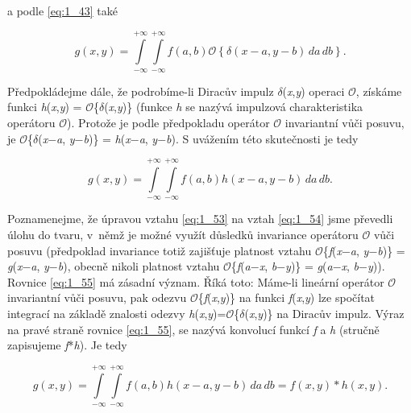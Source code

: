 \noindent a podle \eqref{eq:1_43} také

\begin{equation} \label{eq:1_54}
    g(x, y) = \int\limits_{-\infty}^{+\infty} \int\limits_{-\infty}^{+\infty} f(a, b) \mathcal{O} \left\{ \delta(x-a, y-b) \,da \,db \right\}.
\end{equation}

Předpokládejme dále, že podrobíme-li Diracův impulz $\delta$(\textit{x},\textit{y}) operaci $\mathscr{O}$, získáme funkci \textit{h}(\textit{x},\textit{y}) = $\mathscr{O}$\{$\delta$(\textit{x},\textit{y})\} (funkce \textit{h} se nazývá impulzová charakteristika operátoru $\mathscr{O}$). Protože je podle předpokladu operátor $\mathscr{O}$ invariantní vůči posuvu, je $\mathscr{O}$\{$\delta$(\textit{x}$-$\textit{a}, \textit{y}$-$\textit{b})\} = \textit{h}(\textit{x}$-$\textit{a}, \textit{y}$-$\textit{b}). S uvážením této skutečnosti je tedy

\begin{equation} \label{eq:1_55}
    g(x, y) = \int\limits_{-\infty}^{+\infty} \int\limits_{-\infty}^{+\infty} f(a, b) h(x-a, y-b) \,da \,db.
\end{equation}

Poznamenejme, že úpravou vztahu \eqref{eq:1_53} na vztah \eqref{eq:1_54} jsme převedli úlohu do tvaru, v~němž je možné využít důsledků invariance operátoru $\mathscr{O}$ vůči posuvu (předpoklad invariance totiž zajišťuje platnost vztahu $\mathscr{O}$\{\textit{f}(\textit{x}$-$\textit{a}, \textit{y}$-$\textit{b})\} =  \textit{g}(\textit{x}$-$\textit{a}, \textit{y}$-$\textit{b}), obecně nikoli platnost vztahu $\mathscr{O}$\{\textit{f}(\textit{a}$-$\textit{x}, \textit{b}$-$\textit{y})\} =  \textit{g}(\textit{a}$-$\textit{x}, \textit{b}$-$\textit{y})). Rovnice \eqref{eq:1_55} má zásadní význam. Říká toto: Máme-li lineární operátor $\mathscr{O}$ invariantní vůči posuvu, pak odezvu $\mathscr{O}$\{\textit{f}(\textit{x},\textit{y})\} na funkci \textit{f}(\textit{x},\textit{y}) lze spočítat integrací na základě znalosti odezvy \textit{h}(\textit{x},\textit{y})=$\mathscr{O}$\{$\delta$(\textit{x},\textit{y})\} na Diracův impulz. Výraz na pravé straně rovnice \eqref{eq:1_55}, se nazývá konvolucí funkcí \textit{f} a \textit{h} (stručně zapisujeme \textit{f}*\textit{h}). Je tedy

\begin{equation} \label{eq:1_56}
    g(x, y) = \int\limits_{-\infty}^{+\infty} \int\limits_{-\infty}^{+\infty} f(a, b) h(x-a, y-b) \,da \,db = f(x, y) \ast h(x, y).
\end{equation}

